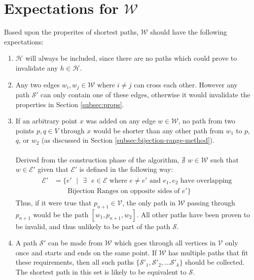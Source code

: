 \documentclass[12pt]{article}
\begin{document}
\section{Expectations for $\mathcal{W}$}\label{subsec:expW}
Based upon the properites of shortest paths, $\mathcal{W}$ should have the
following expectations:
\begin{enumerate}
\item $\mathcal{H}$ will always be included, since there are no paths
which could prove to invalidate any $h \in \mathcal{H}$.
\item Any two edges $w_i,w_j \in \mathcal{W}$ where $i \neq j$ can cross each other.
However any path $\mathcal{S}'$ can only contain one of these edges,
otherwise it would invalidate the properties in Section \ref{subsec:props}.
\item If an arbitrary point $x$ was added on any edge $w \in \mathcal{W}$,
no path from two points $p,q \in V$ through $x$ would be shorter than any other
path from $w_1$ to $p$, $q$, or $w_2$ (as discussed in Section
\ref{subsec:bijection-range-method}).
\\\\
Derived from the construction phase of the algorithm,
$\nexists$ $w \in \mathcal{W}$ such that $w \in \mathcal{E}'$
given that $\mathcal{E}'$ is defined in the following way:
\begin{align*}
&\begin{aligned}
\mathcal{E}' &= \{e'\text{ }|\text{ }\exists\text{ }e \in \mathcal{E} \text{ where } e \neq e'
\text{ and } e_1,e_2 \text{ have overlapping}\\
&\qquad \text{Bijection Ranges on opposite sides of } e'\}
\end{aligned}
\end{align*}
Thus, if it were true that $p_{n+1} \in \mathcal{V}$,
the only path in $\mathcal{W}$ passing
through $p_{n + 1}$ would be the path $[w_1,p_{n+1},w_2]$.
All other paths have been proven to be invalid,
and thus unlikely to be part of the path $\mathcal{S}$.
\item A path $\mathcal{S}'$ can be made from $\mathcal{W}$
which goes through all vertices in $\mathcal{V}$ only once
and starts and ends on the same point.
If $\mathcal{W}$ has multiple paths that fit these requirements, then all such paths
$\{\mathcal{S}'_1, \mathcal{S}'_2, ... \mathcal{S}'_k\}$ should be collected.
The shortest path in this set is likely to be equivalent to $\mathcal{S}$.
\end{enumerate}
\end{document}
